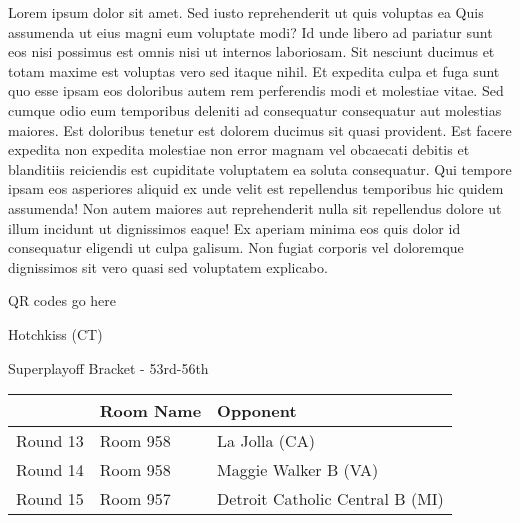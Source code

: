 \documentclass{article}%
\begin{document}
\vspace*{8pt}%
\linebreak%
\newline%
\newline%
Lorem ipsum dolor sit amet. Sed iusto reprehenderit ut quis voluptas ea Quis assumenda ut eius magni eum voluptate modi? Id unde libero ad pariatur sunt eos nisi possimus est omnis nisi ut internos laboriosam. Sit nesciunt ducimus et totam maxime est voluptas vero sed itaque nihil. Et expedita culpa et fuga sunt quo esse ipsam eos doloribus autem rem perferendis modi et molestiae vitae.\newline%
\newline%
Sed cumque odio eum temporibus deleniti ad consequatur consequatur aut molestias maiores. Est doloribus tenetur est dolorem ducimus sit quasi provident. Est facere expedita non expedita molestiae non error magnam vel obcaecati debitis et blanditiis reiciendis est cupiditate voluptatem ea soluta consequatur. Qui tempore ipsam eos asperiores aliquid ex unde velit est repellendus temporibus hic quidem assumenda!\newline%
\newline%
Non autem maiores aut reprehenderit nulla sit repellendus dolore ut illum incidunt ut dignissimos eaque! Ex aperiam minima eos quis dolor id consequatur eligendi ut culpa galisum. Non fugiat corporis vel doloremque dignissimos sit vero quasi sed voluptatem explicabo.\newline%
\newline%
%
\vspace*{30pt}%
\begin{center}%
\begin{Huge}%
QR codes go here%
\end{Huge}%
\end{center}%
\newpage%
\begin{center}%
\begin{Huge}%
Hotchkiss (CT)%
\end{Huge}%
\vspace*{8pt}%
\linebreak%
\begin{Large}%
Superplayoff Bracket {-} 53rd{-}56th%
\end{Large}%
\end{center}%
%
\begin{tabularx}{\textwidth}{|c|Y|Y|}%
\hline%
&Room Name&Opponent\\%
\hline%
Round 13&Room 958&La Jolla (CA)\\%
Round 14&Room 958&Maggie Walker B (VA)\\%
Round 15&Room 957&Detroit Catholic Central B (MI)\\%
\hline%
\end{tabularx}%
\end{document}
